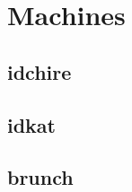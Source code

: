 \section{Machines}\label{sec:contribs:machines}

\subsection{idchire}
\subsection{idkat}
\subsection{brunch}

